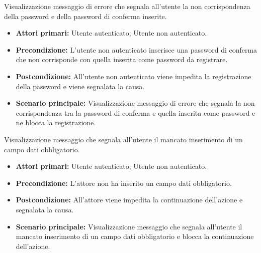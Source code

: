 Visualizzazione messaggio di errore che segnala all'utente la non corrispondenza della password e della password di conferma inserite.
\begin{itemize}
    \item \textbf{Attori primari:} Utente autenticato; Utente non autenticato.
    \item \textbf{Precondizione:} L'utente non autenticato inserisce una password di conferma che non corrisponde con quella inserita come password da registrare.
    \item \textbf{Postcondizione:} All'utente non autenticato viene impedita la registrazione della password e viene segnalata la causa.
    \item \textbf{Scenario principale:} Visualizzazione messaggio di errore che segnala la non corrispondenza tra la password di conferma e quella inserita come password e ne blocca la registrazione.
\end{itemize}

Visualizzazione messaggio che segnala all'utente il mancato inserimento di un campo dati obbligatorio.
\begin{itemize}
    \item \textbf{Attori primari:} Utente autenticato; Utente non autenticato.
    \item \textbf{Precondizione:} L'attore non ha inserito un campo dati obbligatorio.
    \item \textbf{Postcondizione:} All'attore viene impedita la continuazione dell'azione e segnalata la causa.
    \item \textbf{Scenario principale:} Visualizzazione messaggio che segnala all'utente il mancato inserimento di un campo dati obbligatorio e blocca la continuazione dell'azione.
\end{itemize}

